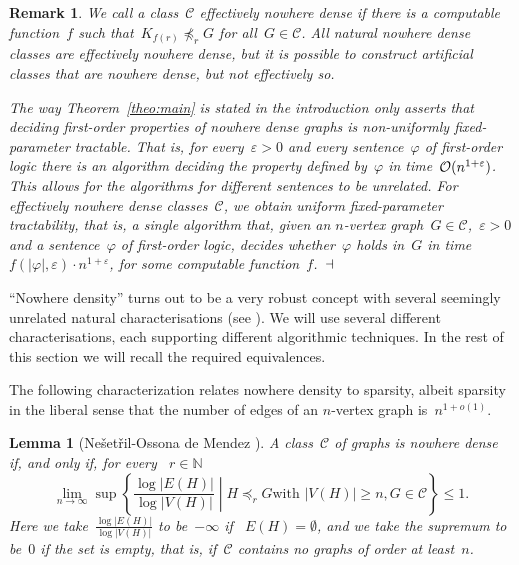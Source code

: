 \documentclass[11pt]{article}
\newtheorem{lemma}[theorem]{Lemma}
\newtheorem{remark}[theorem]{Remark}
\numberwithin{equation}{section}
\newcommand{\N}{{\mathbb N}} \newcommand{\Q}{{\mathbb Q}}
\newcommand{\CCC}{\mathcal{C}} \newcommand{\DDD}{\mathcal{D}}
\newcommand{\Oof}{\mbox{$\cal O$}}
\renewcommand{\phi}{\varphi}
\renewcommand{\epsilon}{\varepsilon}
\begin{document}
\begin{remark}\label{rem:uniform}\upshape
  We call a class~$\CCC$ \emph{effectively nowhere dense} if there is
  a computable function~$f$ such that~$K_{f(r)}\not\preceq_r G$ for
  all~$G\in\CCC$. All natural nowhere dense classes are effectively
  nowhere dense, but it is possible to construct artificial classes
  that are nowhere dense, but not effectively so.

  The way Theorem~\ref{theo:main} is stated in the introduction only
  asserts that deciding first-order properties of nowhere dense graphs
  is \emph{non-uniformly} fixed-parameter tractable. That is, for
  every~$\epsilon>0$ and every sentence~$\phi$ of first-order logic
  there is an algorithm deciding the property defined by~$\phi$ in
  time~$\Oof(n^{1+\epsilon})$. This allows for the algorithms for
  different sentences to be unrelated. For effectively nowhere dense
  classes~$\CCC$, we obtain uniform fixed-parameter tractability, that
  is, a single algorithm that, given an $n$-vertex graph~$G\in\mathcal
  C$,~$\epsilon>0$ and a sentence~$\phi$ of first-order logic, decides
  whether~$\phi$ holds in~$G$ in time ~$f(|\phi|,\epsilon)\cdot
  n^{1+\epsilon}$, for some computable function~$f$.~$\hfill\dashv$
\end{remark}

``Nowhere density'' turns out to be a very robust concept with several
seemingly unrelated natural characterisations (see
\cite{NesetrilOdM12,NesetrilO11}).  We will use several different
characterisations, each supporting different algorithmic techniques. In
the rest of this section we will recall the required equivalences.

The following characterization relates nowhere density to sparsity, albeit
sparsity in the liberal sense that the number of edges of an
$n$-vertex graph is~$n^{1+o(1)}$.

\begin{lemma}[Ne{\v s}et{\v r}il-Ossona de Mendez
  \cite{NesetrilO11}]\label{lem:dens1}
  A class~$\CCC$ of graphs is nowhere dense if, and only if, for every
 ~$r\in \N$
  \begin{equation}\label{eq:ndlimit}
    \lim_{n\to\infty}\sup\left\{\left.\frac{\log|E(H)|}{\log|V(H)|}\;\right|\;
      H\preceq_r G \text{
        with }|V(H)|\ge n, G\in\CCC\right\}\le 1.
  \end{equation}
  Here we take~$\frac{\log|E(H)|}{\log|V(H)|}$ to be~$-\infty$ if
  ~$E(H)=\emptyset$, and we take the supremum to be~$0$ if the set is
  empty, that is, if~$\CCC$ contains no graphs of order at least~$n$.
\end{lemma}
\end{document}
